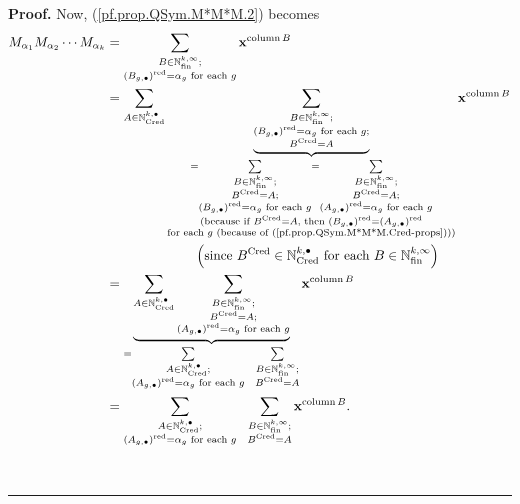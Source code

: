 \documentclass[numbers=enddot,12pt,final,onecolumn,notitlepage,abstracton]{scrartcl}%
\theoremstyle{definition}
\newenvironment{proof}[1][Proof]{\noindent\textbf{#1.} }{\ \rule{0.5em}{0.5em}}
\let\sumnonlimits\sum
\renewcommand{\sum}{\sumnonlimits\limits}
\begin{document}
\begin{proof}
Now, (\ref{pf.prop.QSym.M*M*M.2}) becomes%
\begin{align}
M_{\alpha_{1}}M_{\alpha_{2}}\cdots M_{\alpha_{k}}  &  =\sum_{\substack{B\in
\mathbb{N}_{\operatorname*{fin}}^{k,\infty};\\\left(  B_{g,\bullet}\right)
^{\operatorname*{red}}=\alpha_{g}\text{ for each }g}}\mathbf{x}%
^{\operatorname*{column}B}\nonumber\\
&  =\sum_{A\in\mathbb{N}_{\operatorname*{Cred}}^{k,\bullet}}\underbrace{\sum
_{\substack{B\in\mathbb{N}_{\operatorname*{fin}}^{k,\infty};\\\left(
B_{g,\bullet}\right)  ^{\operatorname*{red}}=\alpha_{g}\text{ for each
}g;\\B^{\operatorname*{Cred}}=A}}}_{\substack{=\sum_{\substack{B\in
\mathbb{N}_{\operatorname*{fin}}^{k,\infty};\\B^{\operatorname*{Cred}%
}=A;\\\left(  B_{g,\bullet}\right)  ^{\operatorname*{red}}=\alpha_{g}\text{
for each }g}}=\sum_{\substack{B\in\mathbb{N}_{\operatorname*{fin}}^{k,\infty
};\\B^{\operatorname*{Cred}}=A;\\\left(  A_{g,\bullet}\right)
^{\operatorname*{red}}=\alpha_{g}\text{ for each }g}}\\\text{(because if
}B^{\operatorname*{Cred}}=A\text{, then }\left(  B_{g,\bullet}\right)
^{\operatorname*{red}}=\left(  A_{g,\bullet}\right)  ^{\operatorname*{red}%
}\\\text{for each }g\text{ (because of (\ref{pf.prop.QSym.M*M*M.Cred-props}%
)))}}}\mathbf{x}^{\operatorname*{column}B}\nonumber\\
&  \ \ \ \ \ \ \ \ \ \ \ \ \ \ \ \ \ \ \ \ \left(  \text{since }%
B^{\operatorname*{Cred}}\in\mathbb{N}_{\operatorname*{Cred}}^{k,\bullet}\text{
for each }B\in\mathbb{N}_{\operatorname*{fin}}^{k,\infty}\right) \nonumber\\
&  =\underbrace{\sum_{A\in\mathbb{N}_{\operatorname*{Cred}}^{k,\bullet}}%
\sum_{\substack{B\in\mathbb{N}_{\operatorname*{fin}}^{k,\infty}%
;\\B^{\operatorname*{Cred}}=A;\\\left(  A_{g,\bullet}\right)
^{\operatorname*{red}}=\alpha_{g}\text{ for each }g}}}_{=\sum_{\substack{A\in
\mathbb{N}_{\operatorname*{Cred}}^{k,\bullet};\\\left(  A_{g,\bullet}\right)
^{\operatorname*{red}}=\alpha_{g}\text{ for each }g}}\ \ \sum_{\substack{B\in
\mathbb{N}_{\operatorname*{fin}}^{k,\infty};\\B^{\operatorname*{Cred}}=A}%
}}\mathbf{x}^{\operatorname*{column}B}\nonumber\\
&  =\sum_{\substack{A\in\mathbb{N}_{\operatorname*{Cred}}^{k,\bullet
};\\\left(  A_{g,\bullet}\right)  ^{\operatorname*{red}}=\alpha_{g}\text{ for
each }g}}\ \ \sum_{\substack{B\in\mathbb{N}_{\operatorname*{fin}}^{k,\infty
};\\B^{\operatorname*{Cred}}=A}}\mathbf{x}^{\operatorname*{column}B}.
\label{pf.prop.QSym.M*M*M.5}%
\end{align}



\end{proof}
\end{document}
